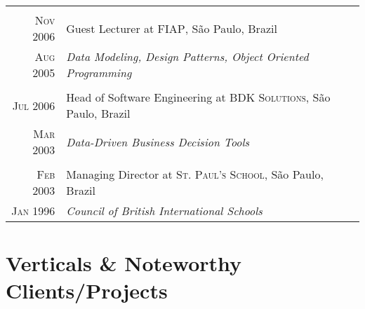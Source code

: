 \documentclass[a4paper,10pt]{article}
\begin{document}
\begin{tabular}{r|p{14cm}}
  \multicolumn{2}{c}{}\\

  \textsc{Nov 2006} & Guest Lecturer at \textsc{FIAP}, S\~{a}o Paulo, Brazil \\

  \textsc{Aug 2005} & \emph{Data Modeling, Design Patterns, Object Oriented
  Programming} \\

  \multicolumn{2}{c}{}\\

  \textsc{Jul 2006} & Head of Software Engineering at \textsc{BDK
    Solutions}, S\~{a}o Paulo, Brazil \\

  \textsc{Mar 2003} & \emph{Data-Driven Business Decision Tools} \\

  \multicolumn{2}{c}{}\\

  \textsc{Feb 2003} & Managing Director at \textsc{St. Paul's School}, S\~{a}o
  Paulo, Brazil \\

  \textsc{Jan 1996} & \emph{Council of British International Schools} \\

\end{tabular}

\section{Verticals \& Noteworthy Clients/Projects}
\end{document}
